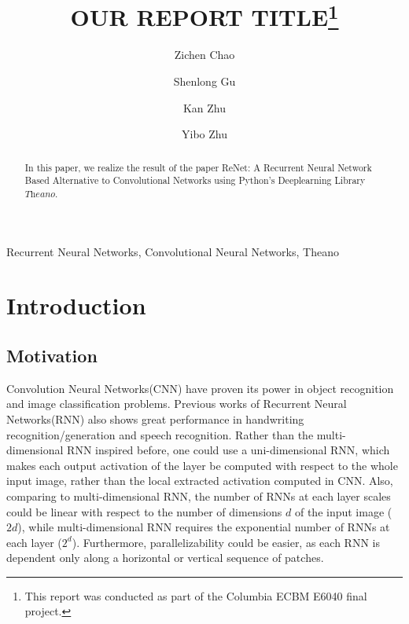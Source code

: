 \documentclass[final,leqno]{siamltex}
\title{OUR REPORT TITLE\thanks{This report was conducted as part of the Columbia ECBM E6040 final project.}}
\author{Zichen Chao\footnotemark[2] \and Shenlong Gu\footnotemark[2] \and Kan Zhu\footnotemark[2] \and Yibo Zhu\footnotemark[3]}
\begin{document}
\maketitle

\renewcommand{\thefootnote}{\fnsymbol{footnote}}


\begin{abstract} 
In this paper, we realize the result of the paper ReNet: A Recurrent Neural Network Based Alternative to Convolutional Networks \cite{renet} using Python's Deeplearning Library $\textit{Theano}$.

\end{abstract} 

\begin{keywords}
Recurrent Neural Networks, Convolutional Neural Networks, Theano
\end{keywords}

\pagestyle{myheadings}
\thispagestyle{plain}

\section{Introduction}
\subsection{Motivation}
Convolution Neural Networks(CNN) have proven its power in object recognition and image classification problems. Previous works of Recurrent Neural Networks(RNN) also shows great performance in handwriting recognition/generation and speech recognition. Rather than the multi-dimensional RNN inspired before, one could use a uni-dimensional RNN, which makes each output activation of the layer be computed with respect to the whole input image, rather than the local extracted activation computed in CNN. Also, comparing to multi-dimensional RNN, the number of RNNs at each layer scales could be linear with respect to the number of dimensions $d$ of the input image ($2d$), while multi-dimensional RNN requires the exponential number of RNNs at each layer ($2^d$). Furthermore, parallelizability could be easier, as each RNN is dependent only along a horizontal or vertical sequence of patches. 
\end{document}
